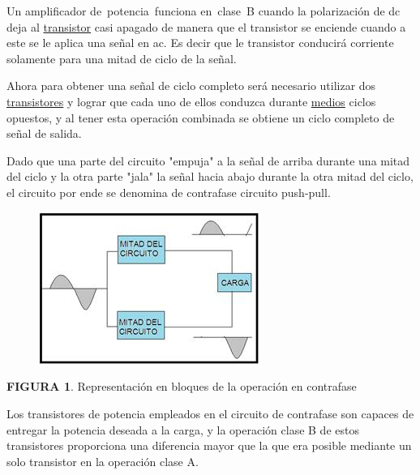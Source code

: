 \documentclass[12pt]{article}
\begin{document}
Un amplificador de potencia funciona en clase B cuando la polarización de dc deja al \href{https://www.monografias.com/trabajos11/trans/trans.shtml}{transistor} casi apagado de manera que el transistor se enciende cuando a este se le aplica una señal en ac. Es decir que le transistor conducirá corriente solamente para una mitad de ciclo de la señal.\par

Ahora para obtener una señal de ciclo completo será necesario utilizar dos \href{https://www.monografias.com/trabajos11/trans/trans.shtml}{transistores} y lograr que cada uno de ellos conduzca durante \href{https://www.monografias.com/trabajos14/medios-comunicacion/medios-comunicacion.shtml}{medios} ciclos opuestos, y al tener esta operación combinada se obtiene un ciclo completo de señal de salida.\par

Dado que una parte del circuito "empuja" a la señal de arriba durante una mitad del ciclo y la otra parte "jala" la señal hacia abajo durante la otra mitad del ciclo, el circuito por ende se denomina de contrafase circuito push-pull.\par




\begin{figure}[H]
	\begin{Center}
		\includegraphics[width=2.82in,height=1.95in]{./media/image1.jpeg}
	\end{Center}
\end{figure}



\par

\textbf{FIGURA 1}. Representación en bloques de la operación en contrafase\par

Los transistores de potencia empleados en el circuito de contrafase son capaces de entregar la potencia deseada a la carga, y la operación clase B de estos transistores proporciona una diferencia mayor que la que era posible mediante un solo transistor en la operación clase A.\par
\end{document}
